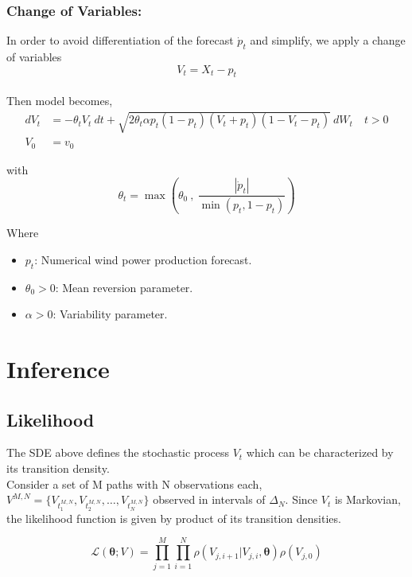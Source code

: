 \documentclass[ima, 20pt, portrait, plainboxedsections]{sciposter}
\begin{document}
\begin{multicols}{3}
\subsubsection*{Change of Variables:}
In order to avoid differentiation of the forecast $\dot{p}_t$ and simplify, we apply a change of variables $$V_t = X_t - p_t$$  \\
Then  model becomes,
\begin{equation}
\begin{split}
dV_t &=  - \theta_t V_t \  dt + \sqrt{2 \theta_t \alpha p_t(1-p_t) (V_t +p_t ) (1-V_t-p_t)} \  dW_t \quad t > 0 \\
V_0 & = v_0
\end{split}\label{main}
\end{equation}


with
\begin{equation}
\theta_t = \max \left( \theta_0 \ , \ \frac{|\dot{p}_t|}{\min (p_t, 1-p_t)}  \right )
\end{equation}

Where 
\begin{itemize}
\item $p_t$: Numerical wind power production forecast.
\item $\theta_0 >0$: Mean reversion parameter.
\item $\alpha>0$: Variability parameter.
\end{itemize}


\section*{Inference}

\subsection*{Likelihood}
The SDE above defines the stochastic process $V_t$ which can be characterized by its transition density. \\

Consider a set of M paths with N observations each, $ V^{M,N}=\{ V_{t_1^{M,N}} , V_{t_2^{M,N}} ,\ldots , V_{t_N^{M,N}} \}$ observed in intervals of $\Delta_N$. Since $V_t$ is Markovian, the likelihood function is given by  product of its  transition densities.

\begin{equation}
\mathcal{L}(\bm{\theta};V) =\prod\limits_{j=1}^M \prod\limits_{i=1}^N \rho ( {V_{j,i+1}|V_{j,i}}, \bm{\theta})  \rho (V_{j,0}) 
\label{likelihood}
\end{equation}


\end{multicols}
\end{document}
